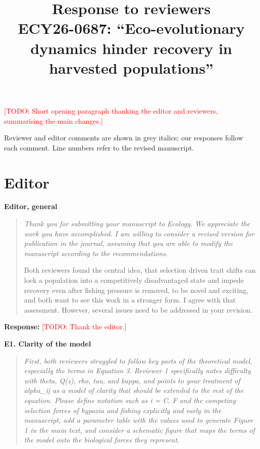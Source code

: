 \documentclass[11pt]{article}
\title{Response to reviewers\\[0.5ex]
\large ECY26-0687: ``Eco-evolutionary dynamics hinder recovery in harvested populations''}
\author{}
\date{}
\newenvironment{revcomment}[1]
  {\par\medskip\noindent\textbf{#1}\par\begin{quote}\itshape\color{commentgrey}}
  {\end{quote}}
\newcommand{\response}{\par\noindent\textbf{Response:} }
\newcommand{\todo}[1]{\textcolor{red}{[TODO: #1]}}
\begin{document}
\maketitle

\todo{Short opening paragraph thanking the editor and reviewers, summarising the main changes.}

Reviewer and editor comments are shown in grey italics; our responses follow each comment. Line numbers refer to the revised manuscript.

\section*{Editor}

\begin{revcomment}{Editor, general}
Thank you for submitting your manuscript to Ecology. We appreciate the work you have accomplished. I am willing to consider a revised version for publication in the journal, assuming that you are able to modify the manuscript according to the recommendations.

Both reviewers found the central idea, that selection driven trait shifts can lock a population into a competitively disadvantaged state and impede recovery even after fishing pressure is removed, to be novel and exciting, and both want to see this work in a stronger form. I agree with that assessment. However, several issues need to be addressed in your revision.
\end{revcomment}

\response \todo{Thank the editor.}

\begin{revcomment}{E1. Clarity of the model}
First, both reviewers struggled to follow key parts of the theoretical model, especially the terms in Equation 3. Reviewer 1 specifically notes difficulty with theta, Q(z), rho, tau, and kappa, and points to your treatment of alpha\_ij as a model of clarity that should be extended to the rest of the equation. Please define notation such as i = C, F and the competing selection forces of hypoxia and fishing explicitly and early in the manuscript, add a parameter table with the values used to generate Figure 1 in the main text, and consider a schematic figure that maps the terms of the model onto the biological forces they represent.
\end{revcomment}
\end{document}
